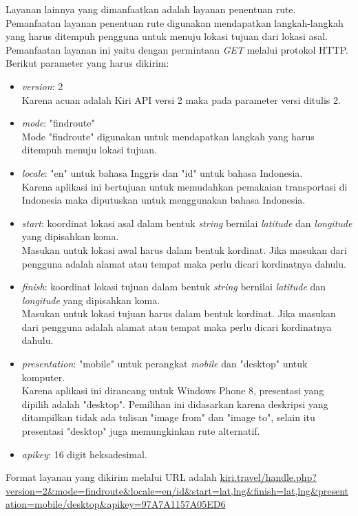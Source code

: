 Layanan lainnya yang dimanfaatkan adalah layanan penentuan rute. Pemanfaatan layanan penentuan rute digunakan mendapatkan langkah-langkah yang harus ditempuh pengguna untuk menuju lokasi tujuan dari lokasi asal. Pemanfaatan layanan ini yaitu dengan permintaan \textit{GET} melalui protokol HTTP. Berikut parameter yang harus dikirim:
\begin{itemize}
	\item \textit{version}: 2 \\
	Karena acuan adalah Kiri API versi 2 maka pada parameter versi ditulis 2.
	\item \textit{mode}: "findroute" \\
	Mode "findroute" digunakan untuk mendapatkan langkah yang harus ditempuh menuju lokasi tujuan.
	\item \textit{locale}: "en" untuk bahasa Inggris dan "id" untuk bahasa Indonesia. \\
	Karena aplikasi ini bertujuan untuk memudahkan pemakaian transportasi di Indonesia maka diputuskan untuk menggunakan bahasa Indonesia.
	\item \textit{start}: koordinat lokasi asal dalam bentuk \textit{string} bernilai \textit{latitude} dan \textit{longitude} yang dipisahkan koma. \\
	Masukan untuk lokasi awal harus dalam bentuk kordinat. Jika masukan dari pengguna adalah alamat atau tempat maka perlu dicari kordinatnya dahulu.
	\item \textit{finish}: koordinat lokasi tujuan dalam bentuk \textit{string} bernilai \textit{latitude} dan \textit{longitude} yang dipisahkan koma. \\
	Masukan untuk lokasi tujuan harus dalam bentuk kordinat. Jika masukan dari pengguna adalah alamat atau tempat maka perlu dicari kordinatnya dahulu.
	\item \textit{presentation}: "mobile" untuk perangkat \textit{mobile} dan "desktop" untuk komputer. \\
	Karena aplikasi ini dirancang untuk Windows Phone 8, presentasi yang dipilih adalah "desktop". Pemilihan ini didasarkan karena deskripsi yang ditampilkan tidak ada tulisan "image from" dan "image to", selain itu presentasi "desktop" juga memungkinkan rute alternatif. 
	\item \textit{apikey}: 16 digit heksadesimal.
\end{itemize}

Format layanan yang dikirim melalui URL adalah \url{kiri.travel/handle.php?version=2&mode=findroute&locale=en/id&start=lat,lng&finish=lat,lng&presentation=mobile/desktop&apikey=97A7A1157A05ED6}

